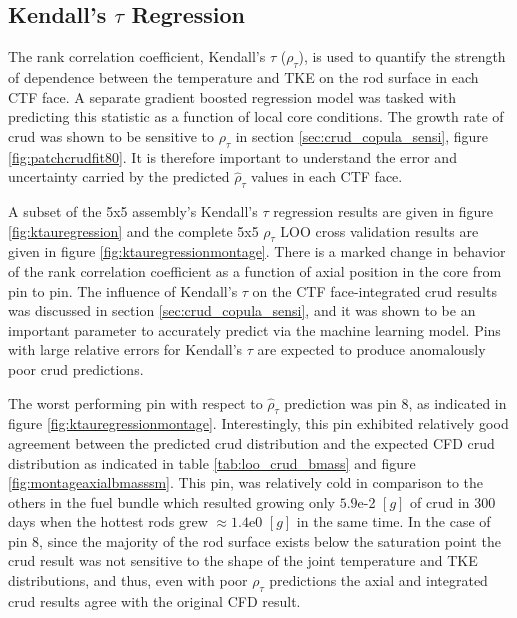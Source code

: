 \subsection{Kendall's $\tau$ Regression}

The rank correlation coefficient, Kendall's $\tau$ ($\rho_\tau$), is used to quantify the strength of dependence between the temperature and TKE on the rod surface in each CTF face.  A separate gradient boosted regression model was tasked with predicting this statistic as a function of local core conditions.   The growth rate of crud was shown to be sensitive to   $\rho_\tau$ in section \ref{sec:crud_copula_sensi}, figure \ref{fig:patchcrudfit80}.  It is therefore important to understand the error and uncertainty carried by the predicted $\hat \rho_\tau$ values in each CTF face.

A subset of the 5x5 assembly's Kendall's $\tau$ regression results are given in figure \ref{fig:ktauregression} and the complete 5x5 $\rho_\tau$ LOO cross validation results are given in figure \ref{fig:ktauregressionmontage}.  There is a marked change in behavior of the rank correlation coefficient as a function of axial position in the core from pin to pin.  The influence of Kendall's $\tau$ on the CTF face-integrated crud results was discussed in section \ref{sec:crud_copula_sensi}, and it was shown to be an important parameter to accurately predict via the machine learning model.  Pins with large relative errors for Kendall's $\tau$ are expected to produce anomalously poor crud predictions.

The worst performing pin with respect to $\hat \rho_\tau$ prediction was pin 8, as indicated in figure \ref{fig:ktauregressionmontage}.  Interestingly, this pin exhibited relatively good agreement between the predicted crud distribution and the expected CFD crud distribution as indicated in table \ref{tab:loo_crud_bmass} and figure \ref{fig:montageaxialbmasssm}.  This pin, was relatively cold in comparison to the others in the fuel bundle which resulted growing only $5.9$e-2 $[g]$ of crud in 300 days when the hottest rods grew $\approx 1.4$e0 $[g]$ in the same time.  In the case of pin 8, since the majority of the rod surface exists below the saturation point the crud result was not sensitive to the shape of the joint temperature and TKE distributions, and thus, even with poor $\rho_\tau$ predictions the axial and integrated crud results agree with the original CFD result.

